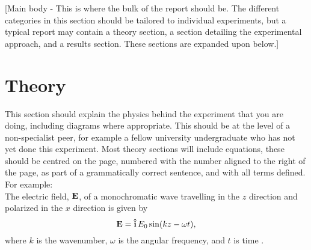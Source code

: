 \documentclass[11pt]{article} %
\newcommand{\citet}{\cite} %
\begin{document}
{\color{blue} {\Large [Main body} - This is where the bulk of the report should be. The different categories in this section should be tailored to individual experiments, but a typical report may contain a theory section, a section detailing the experimental approach, and a results section. These sections are expanded upon below.]}

\section{Theory}
This section should explain the physics behind the experiment that you are doing, including diagrams where appropriate. This should be at the level of a non-specialist peer, for example a fellow university undergraduate who has not yet done this experiment. Most theory sections will include equations, these should be centred on the page, numbered with the number aligned to the right of the page, as part of a grammatically correct sentence, and with all terms defined. For example:\\

 The electric field, ${\bf E}$, of a monochromatic wave travelling in the $z$ direction and polarized in the $x$ direction is given by
%
%
\begin{equation}
\label{secondlaw}
{\bf E} = {\bf  \hat{i}}\, E_0 \sin(kz - \omega t),
\label{eq:wave}
\end{equation}
%
%
where $k$ is the wavenumber, $\omega$ is the angular frequency, and $t$ is time \cite{Morin2008}.


\end{document}
